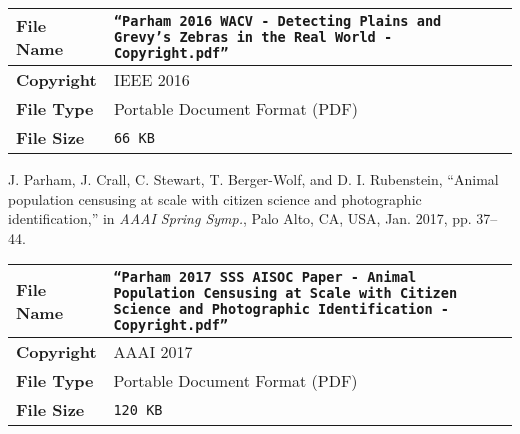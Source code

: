 \begin{table*}[!ht]
    \begin{center}
        \begin{tabular}{| l | p{13.5cm} |}
            \hline
            \textbf{File Name} & \texttt{``Parham 2016 WACV - Detecting Plains and Grevy's Zebras in the Real World - Copyright.pdf''} \\
            \hline
            \textbf{Copyright} & IEEE 2016                                                                                             \\
            \hline
            \textbf{File Type} & Portable Document Format (PDF)                                                                        \\
            \hline
            \textbf{File Size} & \texttt{66 KB}                                                                                        \\
            \hline
        \end{tabular}
    \end{center}
\end{table*}

\begin{tcolorbox}
    J. Parham, J. Crall, C. Stewart, T. Berger-Wolf, and D. I. Rubenstein, ``Animal population censusing at scale with citizen science and photographic identification,'' in \textit{AAAI Spring Symp.}, Palo Alto, CA, USA, Jan. 2017, pp. 37–44.
\end{tcolorbox}

\begin{table*}[!ht]
    \begin{center}
        \begin{tabular}{| l | p{13.5cm} |}
            \hline
            \textbf{File Name} & \texttt{``Parham 2017 SSS AISOC Paper - Animal Population Censusing at Scale with Citizen Science and Photographic Identification - Copyright.pdf''} \\
            \hline
            \textbf{Copyright} & AAAI 2017                                                                                                                                            \\
            \hline
            \textbf{File Type} & Portable Document Format (PDF)                                                                                                                       \\
            \hline
            \textbf{File Size} & \texttt{120 KB}                                                                                                                                      \\
            \hline
        \end{tabular}
    \end{center}
\end{table*}

